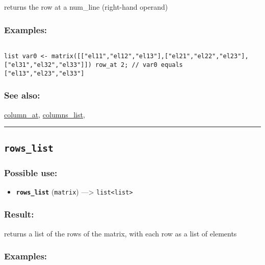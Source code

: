 \documentclass[]{book}
\providecommand{\tightlist}{%
  \setlength{\itemsep}{0pt}\setlength{\parskip}{0pt}}
\theoremstyle{definition}
\theoremstyle{definition}
\theoremstyle{definition}
\theoremstyle{remark}
\begin{document}
returns the row at a num\_line (right-hand operand)

\subsubsection{Examples:}\label{examples-307}

\begin{verbatim}
 
list var0 <- matrix([["el11","el12","el13"],["el21","el22","el23"],["el31","el32","el33"]]) row_at 2; // var0 equals ["el13","el23","el33"]
\end{verbatim}

\subsubsection{See also:}\label{see-also-181}

\href{OperatorsBC\#column_at}{column\_at},
\href{OperatorsBC\#columns_list}{columns\_list},

\begin{center}\rule{0.5\linewidth}{\linethickness}\end{center}

\subsection{\texorpdfstring{\texttt{rows\_list}}{rows\_list}}\label{rows_list}

\subsubsection{Possible use:}\label{possible-use-447}

\begin{itemize}
\tightlist
\item
  \textbf{\texttt{rows\_list}} (\texttt{matrix}) ---\textgreater{}
  \texttt{list\textless{}list\textgreater{}}
\end{itemize}

\subsubsection{Result:}\label{result-433}

returns a list of the rows of the matrix, with each row as a list of
elements

\subsubsection{Examples:}\label{examples-308}
\end{document}
